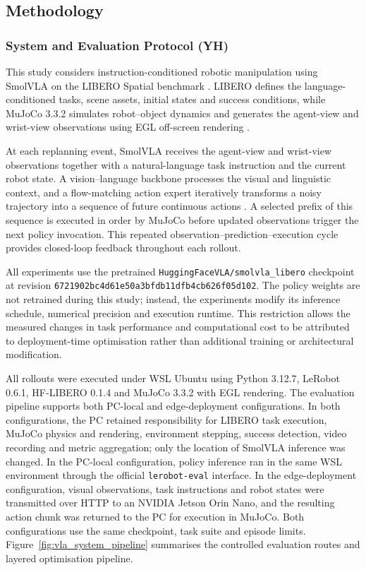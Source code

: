 \subsection{Methodology}

\subsubsection{System and Evaluation Protocol (YH)}
This study considers instruction-conditioned robotic manipulation using SmolVLA on the LIBERO Spatial benchmark \cite{smolvla,libero}. LIBERO defines the language-conditioned tasks, scene assets, initial states and success conditions, while MuJoCo 3.3.2 simulates robot--object dynamics and generates the agent-view and wrist-view observations using EGL off-screen rendering \cite{mujoco}.

At each replanning event, SmolVLA receives the agent-view and wrist-view observations together with a natural-language task instruction and the current robot state. A vision--language backbone processes the visual and linguistic context, and a flow-matching action expert iteratively transforms a noisy trajectory into a sequence of future continuous actions \cite{smolvla}. A selected prefix of this sequence is executed in order by MuJoCo before updated observations trigger the next policy invocation. This repeated observation--prediction--execution cycle provides closed-loop feedback throughout each rollout.

All experiments use the pretrained \texttt{HuggingFaceVLA/smolvla\_libero} checkpoint at revision \texttt{6721902bc4d61e50a3bfdb11dfb4cb626f05d102}. The policy weights are not retrained during this study; instead, the experiments modify its inference schedule, numerical precision and execution runtime. This restriction allows the measured changes in task performance and computational cost to be attributed to deployment-time optimisation rather than additional training or architectural modification.

All rollouts were executed under WSL Ubuntu using Python 3.12.7, LeRobot 0.6.1, HF-LIBERO 0.1.4 and MuJoCo 3.3.2 with EGL rendering. The evaluation pipeline supports both PC-local and edge-deployment configurations. In both configurations, the PC retained responsibility for LIBERO task execution, MuJoCo physics and rendering, environment stepping, success detection, video recording and metric aggregation; only the location of SmolVLA inference was changed. In the PC-local configuration, policy inference ran in the same WSL environment through the official \texttt{lerobot-eval} interface. In the edge-deployment configuration, visual observations, task instructions and robot states were transmitted over HTTP to an NVIDIA Jetson Orin Nano, and the resulting action chunk was returned to the PC for execution in MuJoCo. Both configurations use the same checkpoint, task suite and episode limits. Figure~\ref{fig:vla_system_pipeline} summarises the controlled evaluation routes and layered optimisation pipeline.

